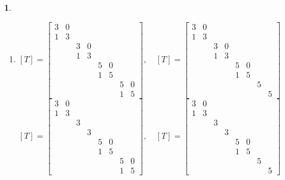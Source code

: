 \documentclass[12pt]{exam}
\newtheorem{exercicio}{}
\begin{document}
\begin{exercicio}
\begin{solucao}
\begin{enumerate}[label=({\alph*})]
      \item $[T] = \begin{bmatrix}
        3 & 0\\
        1 & 3\\
        & & 3 & 0\\
        & & 1 & 3\\
        & & & & 5 & 0\\
        & & & & 1 & 5\\
        & & & & & & 5 & 0\\
        & & & & & & 1 & 5
      \end{bmatrix},\quad [T] = \begin{bmatrix}
        3 & 0\\
        1 & 3\\
        & & 3 & 0\\
        & & 1 & 3\\
        & & & & 5 & 0\\
        & & & & 1 & 5\\
        & & & & & & 5\\
        & & & & & & & 5
      \end{bmatrix}$\\
      $[T] = \begin{bmatrix}
        3 & 0\\
        1 & 3\\
        & & 3\\
        & & & 3\\
        & & & & 5 & 0\\
        & & & & 1 & 5\\
        & & & & & & 5 & 0\\
        & & & & & & 1 & 5
      \end{bmatrix},\quad [T] = \begin{bmatrix}
        3 & 0\\
        1 & 3\\
        & & 3\\
        & & & 3\\
        & & & & 5 & 0\\
        & & & & 1 & 5\\
        & & & & & & 5\\
        & & & & & & & 5
      \end{bmatrix}$
    \end{enumerate}
  \end{solucao}
\end{exercicio}
\end{document}
